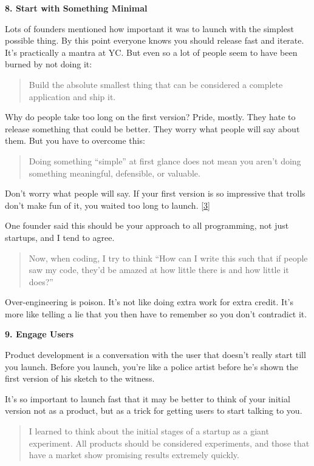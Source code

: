 \textbf{8. Start with Something Minimal}

Lots of founders mentioned how important it was to launch with the
simplest possible thing. By this point everyone knows you should release
fast and iterate. It's practically a mantra at YC. But even so a lot of
people seem to have been burned by not doing it:

\begin{quote}
Build the absolute smallest thing that can be considered a complete
application and ship it.
\end{quote}

Why do people take too long on the first version? Pride, mostly. They
hate to release something that could be better. They worry what people
will say about them. But you have to overcome this:

\begin{quote}
Doing something ``simple'' at first glance does not mean you aren't
doing something meaningful, defensible, or valuable.
\end{quote}

Don't worry what people will say. If your first version is so impressive
that trolls don't make fun of it, you waited too long to launch.
{[}\hyperref[f3n]{3}{]}

One founder said this should be your approach to all programming, not
just startups, and I tend to agree.

\begin{quote}
Now, when coding, I try to think ``How can I write this such that if
people saw my code, they'd be amazed at how little there is and how
little it does?''
\end{quote}

Over-engineering is poison. It's not like doing extra work for extra
credit. It's more like telling a lie that you then have to remember so
you don't contradict it.

\textbf{9. Engage Users}

Product development is a conversation with the user that doesn't really
start till you launch. Before you launch, you're like a police artist
before he's shown the first version of his sketch to the witness.

It's so important to launch fast that it may be better to think of your
initial version not as a product, but as a trick for getting users to
start talking to you.

\begin{quote}
I learned to think about the initial stages of a startup as a giant
experiment. All products should be considered experiments, and those
that have a market show promising results extremely quickly.
\end{quote}

